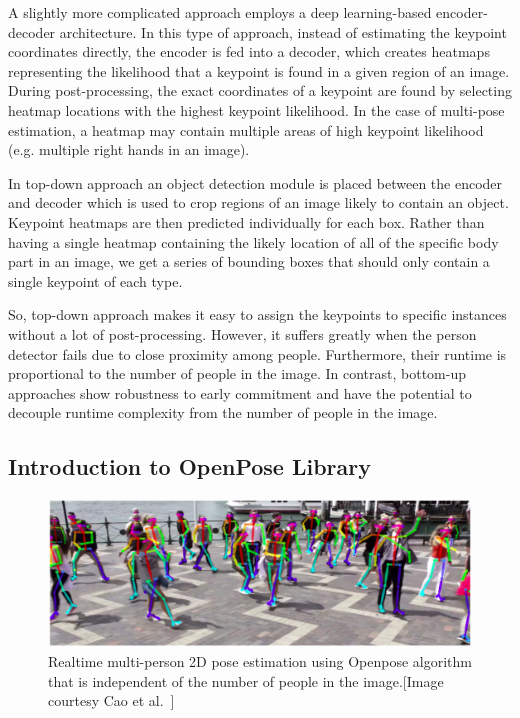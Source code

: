 A slightly more complicated approach employs a deep learning-based encoder-decoder architecture. In this type of approach, instead of estimating the keypoint coordinates directly, the encoder is fed into a decoder, which creates heatmaps representing the likelihood that a keypoint is found in a given region of an image. During post-processing, the exact coordinates of a keypoint are found by selecting heatmap locations with the highest keypoint likelihood. In the case of multi-pose estimation, a heatmap may contain multiple areas of high keypoint likelihood (e.g. multiple right hands in an image). 

In top-down approach an object detection module is placed between the encoder and decoder which is used to crop regions of an image likely to contain an object. Keypoint heatmaps are then predicted individually for each box. Rather than having a single heatmap containing the likely location of all of the specific body part in an image, we get a series of bounding boxes that should only contain a single keypoint of each type. 

So, top-down approach makes it easy to assign the keypoints to specific instances without a lot of post-processing. However, it suffers greatly when the person detector fails due to close proximity among people. Furthermore, their runtime is proportional to the number of people in the image. In contrast, bottom-up approaches show robustness to early commitment and have the potential to decouple runtime complexity from the number of people in the image.


\subsection{Introduction to OpenPose Library} 
\begin{figure}
	\centering
	\includegraphics[width=\textwidth]{figures/openpose_demo.eps}
	\caption[Realtime multi-person 2D pose estimation using Openpose algorithm]
	{Realtime multi-person 2D pose estimation using Openpose algorithm that is independent of the number of people in the image.[Image courtesy Cao et al.~\cite{Cao_19}] \label{fig:openpose_demo}}
\end{figure}

